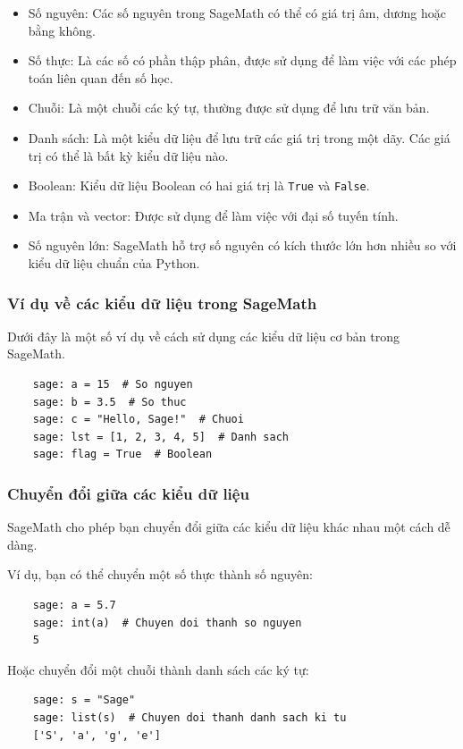 \begin{itemize}
	\item Số nguyên: Các số nguyên trong SageMath có thể có giá trị âm, dương hoặc bằng không.
	\item Số thực: Là các số có phần thập phân, được sử dụng để làm việc với các phép toán liên quan đến số học.
	\item Chuỗi: Là một chuỗi các ký tự, thường được sử dụng để lưu trữ văn bản.
	\item Danh sách: Là một kiểu dữ liệu để lưu trữ các giá trị trong một dãy. Các giá trị có thể là bất kỳ kiểu dữ liệu nào.
	\item Boolean: Kiểu dữ liệu Boolean có hai giá trị là \texttt{True} và \texttt{False}.
	\item Ma trận và vector: Được sử dụng để làm việc với đại số tuyến tính.
	\item Số nguyên lớn: SageMath hỗ trợ số nguyên có kích thước lớn hơn nhiều so với kiểu dữ liệu chuẩn của Python.
\end{itemize}

\subsubsection{Ví dụ về các kiểu dữ liệu trong SageMath}

Dưới đây là một số ví dụ về cách sử dụng các kiểu dữ liệu cơ bản trong SageMath.

\begin{lstlisting}
	sage: a = 15  # So nguyen
	sage: b = 3.5  # So thuc
	sage: c = "Hello, Sage!"  # Chuoi
	sage: lst = [1, 2, 3, 4, 5]  # Danh sach
	sage: flag = True  # Boolean
\end{lstlisting}

\subsubsection{Chuyển đổi giữa các kiểu dữ liệu}

SageMath cho phép bạn chuyển đổi giữa các kiểu dữ liệu khác nhau một cách dễ dàng.

Ví dụ, bạn có thể chuyển một số thực thành số nguyên:

\begin{lstlisting}
	sage: a = 5.7
	sage: int(a)  # Chuyen doi thanh so nguyen
	5
\end{lstlisting}

Hoặc chuyển đổi một chuỗi thành danh sách các ký tự:

\begin{lstlisting}
	sage: s = "Sage"
	sage: list(s)  # Chuyen doi thanh danh sach ki tu
	['S', 'a', 'g', 'e']
\end{lstlisting}

